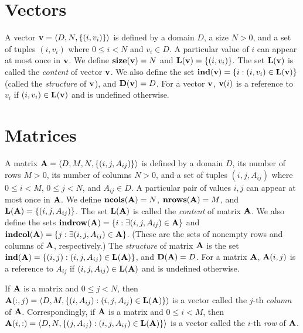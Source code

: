 \section{Vectors}
\label{Sec:Vectors}

A vector ${\bf v} = \langle D, N, \{ (i,v_i) \} \rangle$ is defined by
a domain $D$, a size $N>0$, and a set of tuples $(i,v_i)$ where $0 \leq
i < N$ and $v_i \in D$. A particular value of $i$ can appear at
most once in ${\bf v}$. We define $\mathbf{size}({\bf v}) = N$ and
$\mathbf{L}({\bf v}) = \{ (i,v_i) \}$. The set $\mathbf{L}({\bf v})$ is
called the \emph{content} of vector ${\bf v}$. We also define the set
${\bf ind({\bf v})} = \{ i : (i,v_i) \in \mathbf{L}({\bf v}) \}$
(called the \emph{structure} of ${\bf v}$), and $\mathbf{D}({\bf v})
= D$. For a vector ${\bf v}$, ${\bf v}(i)$ is a reference to $v_i$
if $(i,v_i) \in \mathbf{L}({\bf v})$ and is undefined otherwise.

\section{Matrices}
\label{Sec:Matrices}

A matrix ${\bf A} = \langle D, M, N, \{ (i,j,A_{ij}) \} \rangle$ is
defined by a domain $D$, its number of rows $M>0$, its number of columns
$N>0$, and a set of tuples $(i,j,A_{ij})$ where $0 \leq i < M$, $0 \leq
j < N$, and $A_{ij} \in D$. A particular pair of values $i,j$ can
appear at most once in ${\bf A}$. We define $\mathbf{ncols}({\bf A})
= N$,  $\mathbf{nrows}({\bf A}) = M$, and $\mathbf{L}({\bf A}) =
\{ (i,j,A_{ij}) \}$.  The set $\mathbf{L}({\bf A})$ is called the
\emph{content} of matrix ${\bf A}$.  We also define the sets
${\bf indrow({\bf A})} = \{ i : \exists (i,j,A_{ij}) \in
{\bf A} \}$ and ${\bf indcol({\bf A})} = \{ j : \exists
(i,j,A_{ij}) \in {\bf A} \}$.  (These are the sets of nonempty
rows and columns of ${\bf A}$, respectively.)  The \emph{structure}
of matrix ${\bf A}$ is the set $\mathbf{ind}({\bf A}) = \{ (i,j) :
(i,j,A_{ij}) \in \mathbf{L}({\bf A}) \}$, and $\mathbf{D}({\bf A}) = D$.
For a matrix ${\bf A}$, ${\bf A}(i,j)$ is a reference to $A_{ij}$
if $(i,j,A_{ij}) \in \mathbf{L}({\bf A})$ and is undefined otherwise.

If ${\bf A}$ is a matrix and $0 \leq j < N$, then ${\bf A}(:,j)
= \langle D, M, \{(i,A_{ij}) : (i,j,A_{ij}) \in \mathbf{L}({\bf A})
\} \rangle$ is a vector called the $j$-th \emph{column}
of ${\bf A}$. Correspondingly, if ${\bf A}$ is a matrix and
$0 \leq i < M$, then ${\bf A}(i,:) = \langle D, N, \{(j,A_{ij}) :
(i,j,A_{ij}) \in \mathbf{L}({\bf A}) \} \rangle$ is a vector called
the $i$-th \emph{row} of ${\bf A}$.

